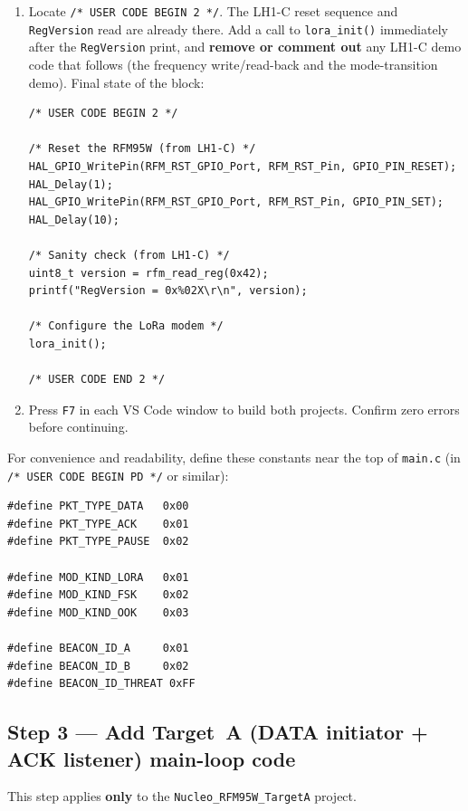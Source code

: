\documentclass[11pt,letterpaper]{article}
\begin{document}
\begin{enumerate}[leftmargin=2em]
	\newpage
	\item Locate \texttt{/* USER CODE BEGIN 2 */}. The LH1-C reset sequence and \texttt{RegVersion} read are already there. Add a call to \texttt{lora\_init()} immediately after the \texttt{RegVersion} print, and \textbf{remove or comment out} any LH1-C demo code that follows (the frequency write/read-back and the mode-transition demo). Final state of the block:
\begin{verbatim}
/* USER CODE BEGIN 2 */

/* Reset the RFM95W (from LH1-C) */
HAL_GPIO_WritePin(RFM_RST_GPIO_Port, RFM_RST_Pin, GPIO_PIN_RESET);
HAL_Delay(1);
HAL_GPIO_WritePin(RFM_RST_GPIO_Port, RFM_RST_Pin, GPIO_PIN_SET);
HAL_Delay(10);

/* Sanity check (from LH1-C) */
uint8_t version = rfm_read_reg(0x42);
printf("RegVersion = 0x%02X\r\n", version);

/* Configure the LoRa modem */
lora_init();

/* USER CODE END 2 */
\end{verbatim}

	\item Press \texttt{F7} in each VS Code window to build both projects. Confirm zero errors before continuing.
\end{enumerate}

\begin{tcolorbox}[infobox={Packet-type and modulation-kind constants}]
	For convenience and readability, define these constants near the top of \texttt{main.c} (in \texttt{/* USER CODE BEGIN PD */} or similar):
\begin{verbatim}
#define PKT_TYPE_DATA   0x00
#define PKT_TYPE_ACK    0x01
#define PKT_TYPE_PAUSE  0x02

#define MOD_KIND_LORA   0x01
#define MOD_KIND_FSK    0x02
#define MOD_KIND_OOK    0x03

#define BEACON_ID_A     0x01
#define BEACON_ID_B     0x02
#define BEACON_ID_THREAT 0xFF
\end{verbatim}
\end{tcolorbox}

\newpage
\subsection{Step 3 --- Add Target~A (DATA initiator + ACK listener) main-loop code}

This step applies \textbf{only} to the \texttt{Nucleo\_RFM95W\_TargetA} project.
\end{document}
